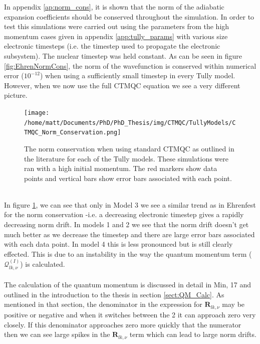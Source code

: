 \noindent In appendix \ref{ap:norm_cons}, it is shown that the norm of the adiabatic expansion coefficients should be conserved throughout the simulation. In order to test this simulations were carried out using the parameters from the high momentum cases given in appendix \ref{app:tully_params} with various size electronic timesteps (i.e. the timestep used to propagate the electronic subsystem). The nuclear timestep was held constant. As can be seen in figure \ref{fig:EhrenNormCons}, the norm of the wavefunction is conserved within numerical error ($10^{-12}$) when using a sufficiently small timestep in every Tully model. However, when we now use the full CTMQC equation we see a very different picture.
\begin{figure}[h]
	\texttt{[image: /home/matt/Documents/PhD/PhD\_Thesis/img/CTMQC/TullyModels/CTMQC\_Norm\_Conservation.png]}
	\caption{\label{fig:CTMQCNormCons}The norm conservation when using standard CTMQC as outlined in the literature for each of the Tully models. These simulations were ran with a high initial momentum. The red markers show data points and vertical bars show error bars associated with each point.}
\end{figure}
\\
In figure \ref{fig:CTMQCNormCons}, we can see that only in Model 3 we see a similar trend as in Ehrenfest for the norm conservation -i.e. a decreasing electronic timestep gives a rapidly decreasing norm drift. In models 1 and 2 we see that the norm drift doesn't get much better as we decrease the timestep and there are large error bars associated with each data point. In model 4 this is less pronounced but is still clearly effected. This is due to an instability in the way the quantum momentum term ($\mathcal{Q}_{lk, \nu}^{(I)}$) is calculated.
\\\\
The calculation of the quantum momentum is discussed in detail in Min, 17 \cite{min_ab_2017} and outlined in the introduction to the thesis in section \ref{sect:QM_Calc}. As mentioned in that section, the denominator in the expression for $\mathbf{R}_{lk, \nu}$ may be positive or negative and when it switches between the 2 it can approach zero very closely. If this denominator approaches zero more quickly that the numerator then we can see large spikes in the $\mathbf{R}_{lk, \nu}$ term which can lead to large norm drifts.

